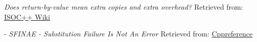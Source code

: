     \emph{Does return-by-value mean extra copies and extra overhead?}
    \newline
    Retrieved from: \href{https://isocpp.org/wiki/faq/ctors#return-by-value-optimization}{ISOC++ Wiki}

     - \emph{SFINAE - Substitution Failure Is Not An Error}
    \newline
    Retrieved from: \href{https://en.cppreference.com/w/cpp/language/sfinae}{Cppreference}
